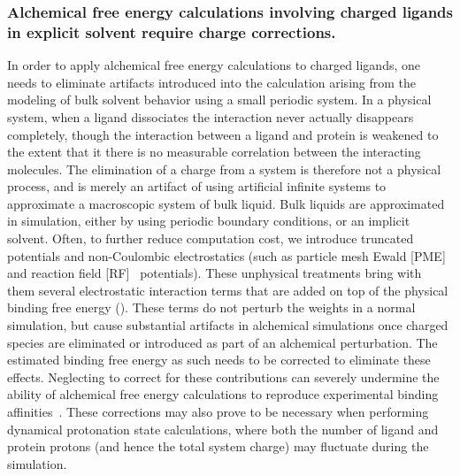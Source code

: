 \documentclass[10pt,final]{article}
\begin{document}
\subsubsection*{Alchemical free energy calculations involving charged ligands in explicit solvent require charge corrections.}
In order to apply alchemical free energy calculations to charged ligands, one needs to eliminate artifacts introduced into the calculation arising from the modeling of bulk solvent behavior using a small periodic system.
%
In a physical system, when a ligand dissociates the interaction never actually disappears completely, though the interaction between a ligand and protein is weakened to the extent that it there is no measurable correlation between the interacting molecules.
%
The elimination of a charge from a system is therefore not a physical process, and is merely an artifact of using artificial infinite systems to approximate a macroscopic system of bulk liquid.
%
Bulk liquids are approximated in simulation, either by using periodic boundary conditions, or an implicit solvent.
%
Often, to further reduce computation cost, we introduce truncated potentials and non-Coulombic electrostatics (such as particle mesh Ewald [PME]~\autocite{Essmann1995a} and reaction field [RF]~\autocite{Tironi1995a} potentials). 
%
These unphysical treatments bring with them several electrostatic interaction terms that are added on top of the physical binding free energy ().
%
These terms do not perturb the weights in a normal simulation, but cause substantial artifacts in alchemical simulations once charged species are eliminated or introduced as part of an alchemical perturbation.
%
The estimated binding free energy as such needs to be corrected to eliminate these effects.
%
Neglecting to correct for these contributions can severely undermine the ability of alchemical free energy calculations to reproduce experimental binding affinities~\autocite{Rocklin2013b,Muddana2014a}.
%
These corrections may also prove to be necessary when performing dynamical protonation state calculations, where both the number of ligand and protein protons (and hence the total system charge) may fluctuate during the simulation.
\end{document}
